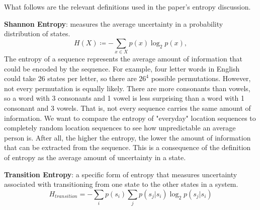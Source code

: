 \documentclass[11pt]{amsart}
\begin{document}
What follows are the relevant definitions used in the paper's entropy discussion.

\textbf{Shannon Entropy}: measures the average uncertainty in a probability distribution of states.
\begin{equation}
    \label{entropyeq}
    H( X ) ≔ - \sum_{x ∈ X}p( x )\log_2 p( x ),
\end{equation}
The entropy of a sequence represents the average amount of information that could be encoded by the sequence.
For example, four letter words in English could take 26 states per letter, so there are $26^4$ possible permutations.
However, not every permutation is equally likely.
There are more consonants than vowels, so a word with 3 consonants and 1 vowel is less surprising than a word with 1 consonant and 3 vowels.
That is, not every sequence carries the same amount of information.
We want to compare the entropy of "everyday" location sequences to completely random location sequences to see how unpredictable an average person is.
After all, the higher the entropy, the lower the amount of information that can be extracted from the sequence.
This is a consequence of the definition of entropy as the average amount of uncertainty in a state.

\textbf{Transition Entropy}: a specific form of entropy that measures uncertainty associated with transitioning from one state to the other states in a system.
\begin{equation}
    \label{transition_entropy}
    H_{transition} = -\sum_i p( s_i )\sum_j p( s_j|s_i )\log_2 p( s_j|s_i )
\end{equation}
\end{document}
